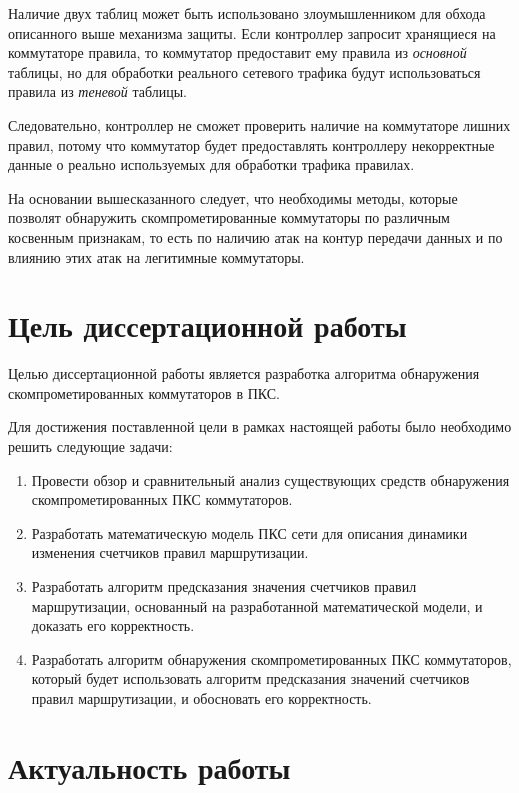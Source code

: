 \documentclass[../thesis.tex]{subfiles}
\begin{document}
Наличие двух таблиц может быть использовано злоумышленником для обхода описанного выше механизма защиты.
Если контроллер запросит хранящиеся на коммутаторе правила, то коммутатор предоставит ему правила из \textit{основной} таблицы, но для обработки реального сетевого трафика будут использоваться правила из \textit{теневой} таблицы.

Следовательно, контроллер не сможет проверить наличие на коммутаторе лишних правил, потому что коммутатор будет предоставлять контроллеру некорректные данные о реально используемых для обработки трафика правилах.

На основании вышесказанного следует, что необходимы методы, которые позволят обнаружить скомпрометированные коммутаторы по различным косвенным признакам, то есть по наличию атак на контур передачи данных и по влиянию этих атак на легитимные коммутаторы.
   
\pagebreak

\section*{Цель диссертационной работы}
    
Целью диссертационной работы является разработка алгоритма обнаружения скомпрометированных коммутаторов в ПКС.

Для достижения поставленной цели в рамках настоящей работы было необходимо решить следующие задачи:

\begin{enumerate}
\item Провести обзор и сравнительный анализ существующих средств обнаружения скомпрометированных ПКС коммутаторов.
\item Разработать математическую модель ПКС сети для описания динамики изменения счетчиков правил маршрутизации.
\item Разработать алгоритм предсказания значения счетчиков правил маршрутизации, основанный на разработанной математической модели, и доказать его корректность.
\item Разработать алгоритм обнаружения скомпрометированных ПКС коммутаторов, который будет использовать алгоритм предсказания значений счетчиков правил маршрутизации, и обосновать его корректность.
\end{enumerate}

\section*{Актуальность работы}
\end{document}
